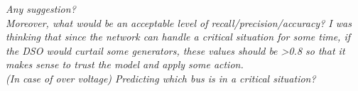 
\noindent \emph{Any suggestion? \\ Moreover, what would be an acceptable level of recall/precision/accuracy? I was thinking that since the network can handle a critical situation for some time, if the DSO would curtail some generators, these values should be >0.8 so that it makes sense to trust the model and apply some action.} \label{q:evaluation}\\

\noindent \emph{(In case of over voltage) Predicting which bus is in a critical situation?}

    



